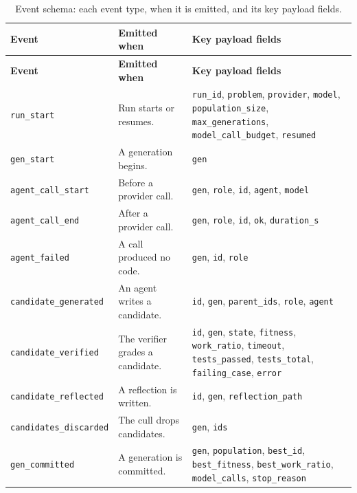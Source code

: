 \begingroup\setlength{\tabcolsep}{4pt}\scriptsize
\begin{longtable}{@{}p{}p{}p{}@{}}
\caption{Event schema: each event type, when it is emitted, and its key payload
fields.}\label{tab:events}\\
\toprule
\textbf{Event} & \textbf{Emitted when} & \textbf{Key payload fields} \\
\midrule
\endfirsthead
\toprule
\textbf{Event} & \textbf{Emitted when} & \textbf{Key payload fields} \\
\midrule
\endhead
\bottomrule
\endfoot
\texttt{run\_start} & Run starts or resumes. & \texttt{run\_id}, \texttt{problem}, \texttt{provider}, \texttt{model}, \texttt{population\_size}, \texttt{max\_generations}, \texttt{model\_call\_budget}, \texttt{resumed} \\
\addlinespace[1pt]
\texttt{gen\_start} & A generation begins. & \texttt{gen} \\
\addlinespace[1pt]
\texttt{agent\_call\_start} & Before a provider call. & \texttt{gen}, \texttt{role}, \texttt{id}, \texttt{agent}, \texttt{model} \\
\addlinespace[1pt]
\texttt{agent\_call\_end} & After a provider call. & \texttt{gen}, \texttt{role}, \texttt{id}, \texttt{ok}, \texttt{duration\_s} \\
\addlinespace[1pt]
\texttt{agent\_failed} & A call produced no code. & \texttt{gen}, \texttt{id}, \texttt{role} \\
\addlinespace[1pt]
\texttt{candidate\_generated} & An agent writes a candidate. & \texttt{id}, \texttt{gen}, \texttt{parent\_ids}, \texttt{role}, \texttt{agent} \\
\addlinespace[1pt]
\texttt{candidate\_verified} & The verifier grades a candidate. & \texttt{id}, \texttt{gen}, \texttt{state}, \texttt{fitness}, \texttt{work\_ratio}, \texttt{timeout}, \texttt{tests\_passed}, \texttt{tests\_total}, \texttt{failing\_case}, \texttt{error} \\
\addlinespace[1pt]
\texttt{candidate\_reflected} & A reflection is written. & \texttt{id}, \texttt{gen}, \texttt{reflection\_path} \\
\addlinespace[1pt]
\texttt{candidates\_discarded} & The cull drops candidates. & \texttt{gen}, \texttt{ids} \\
\addlinespace[1pt]
\texttt{gen\_committed} & A generation is committed. & \texttt{gen}, \texttt{population}, \texttt{best\_id}, \texttt{best\_fitness}, \texttt{best\_work\_ratio}, \texttt{model\_calls}, \texttt{stop\_reason} \\

\end{longtable}
